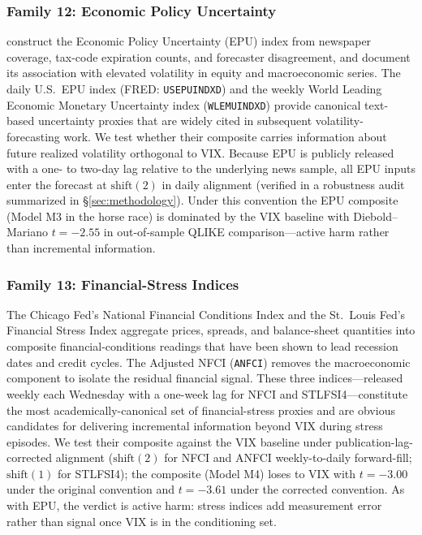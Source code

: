 \documentclass[12pt,a4paper]{article}
\begin{document}
\subsubsection{Family 12: Economic Policy Uncertainty}

\citet{baker2016} construct the Economic Policy Uncertainty (EPU) index from newspaper coverage, tax-code expiration counts, and forecaster disagreement, and document its association with elevated volatility in equity and macroeconomic series. The daily U.S.\ EPU index (FRED: \texttt{USEPUINDXD}) and the weekly World Leading Economic Monetary Uncertainty index (\texttt{WLEMUINDXD}) provide canonical text-based uncertainty proxies that are widely cited in subsequent volatility-forecasting work. We test whether their composite carries information about future realized volatility orthogonal to VIX. Because EPU is publicly released with a one- to two-day lag relative to the underlying news sample, all EPU inputs enter the forecast at $\text{shift}(2)$ in daily alignment (verified in a robustness audit summarized in \S\ref{sec:methodology}). Under this convention the EPU composite (Model M3 in the horse race) is dominated by the VIX baseline with Diebold--Mariano $t=-2.55$ in out-of-sample QLIKE comparison---active harm rather than incremental information.

\subsubsection{Family 13: Financial-Stress Indices}

The Chicago Fed's National Financial Conditions Index \citep[NFCI;][]{brave2011} and the St.\ Louis Fed's Financial Stress Index \citep[STLFSI;][]{kliesen2010} aggregate prices, spreads, and balance-sheet quantities into composite financial-conditions readings that have been shown to lead recession dates and credit cycles. The Adjusted NFCI (\texttt{ANFCI}) removes the macroeconomic component to isolate the residual financial signal. These three indices---released weekly each Wednesday with a one-week lag for NFCI and STLFSI4---constitute the most academically-canonical set of financial-stress proxies and are obvious candidates for delivering incremental information beyond VIX during stress episodes. We test their composite against the VIX baseline under publication-lag-corrected alignment ($\text{shift}(2)$ for NFCI and ANFCI weekly-to-daily forward-fill; $\text{shift}(1)$ for STLFSI4); the composite (Model M4) loses to VIX with $t=-3.00$ under the original convention and $t=-3.61$ under the corrected convention. As with EPU, the verdict is active harm: stress indices add measurement error rather than signal once VIX is in the conditioning set.
\end{document}
